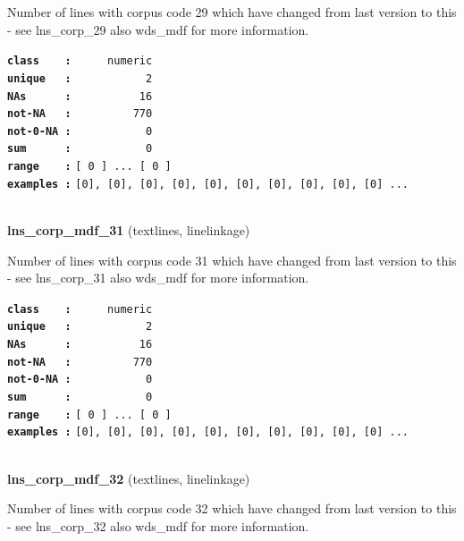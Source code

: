 \documentclass[]{article}
\begin{document}
Number of lines with corpus code 29 which have changed from last version
to this - see lns\_corp\_29 also wds\_mdf for more information.

\textbf{\texttt{class\ \ \ \ :}} \texttt{~~~~~numeric}\\
\textbf{\texttt{unique\ \ \ :}} \texttt{~~~~~~~~~~~2}\\
\textbf{\texttt{NAs\ \ \ \ \ \ :}} \texttt{~~~~~~~~~~16}\\
\textbf{\texttt{not-NA\ \ \ :}} \texttt{~~~~~~~~~770}\\
\textbf{\texttt{not-0-NA\ :}} \texttt{~~~~~~~~~~~0}\\
\textbf{\texttt{sum\ \ \ \ \ \ :}} \texttt{~~~~~~~~~~~0}\\
\textbf{\texttt{range\ \ \ \ :}}
\texttt{{[}\ 0\ {]}\ ...\ {[}\ 0\ {]}}\\
\textbf{\texttt{examples\ :}}
\texttt{{[}0{]},\ {[}0{]},\ {[}0{]},\ {[}0{]},\ {[}0{]},\ {[}0{]},\ {[}0{]},\ {[}0{]},\ {[}0{]},\ {[}0{]}\ ...}\\

~

\textbf{lns\_corp\_mdf\_31} (textlines, linelinkage)

Number of lines with corpus code 31 which have changed from last version
to this - see lns\_corp\_31 also wds\_mdf for more information.

\textbf{\texttt{class\ \ \ \ :}} \texttt{~~~~~numeric}\\
\textbf{\texttt{unique\ \ \ :}} \texttt{~~~~~~~~~~~2}\\
\textbf{\texttt{NAs\ \ \ \ \ \ :}} \texttt{~~~~~~~~~~16}\\
\textbf{\texttt{not-NA\ \ \ :}} \texttt{~~~~~~~~~770}\\
\textbf{\texttt{not-0-NA\ :}} \texttt{~~~~~~~~~~~0}\\
\textbf{\texttt{sum\ \ \ \ \ \ :}} \texttt{~~~~~~~~~~~0}\\
\textbf{\texttt{range\ \ \ \ :}}
\texttt{{[}\ 0\ {]}\ ...\ {[}\ 0\ {]}}\\
\textbf{\texttt{examples\ :}}
\texttt{{[}0{]},\ {[}0{]},\ {[}0{]},\ {[}0{]},\ {[}0{]},\ {[}0{]},\ {[}0{]},\ {[}0{]},\ {[}0{]},\ {[}0{]}\ ...}\\

~

\textbf{lns\_corp\_mdf\_32} (textlines, linelinkage)

Number of lines with corpus code 32 which have changed from last version
to this - see lns\_corp\_32 also wds\_mdf for more information.
\end{document}
